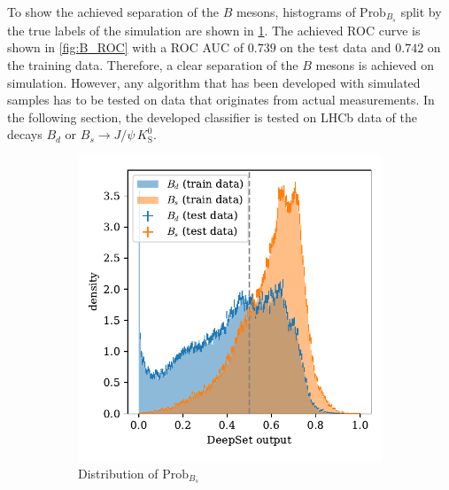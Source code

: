 To show the achieved separation of the $B$ mesons, histograms of $\text{Prob}_{B_s}$ split by the true labels of the simulation are shown in \cref{fig:B_output}.
The achieved ROC curve is shown in \cref{fig:B_ROC} with a ROC AUC of $0.739$ on the test data and $0.742$ on the training data.
Therefore, a clear separation of the $B$ mesons is achieved on simulation.
However, any algorithm that has been developed with simulated samples has to be tested on data that originates from actual measurements. 
In the following section, the developed classifier is tested on LHCb data of the decays $B_d \text{ or } B_s \rightarrow J/\psi \, K^0_\text{S}$.

\begin{figure}
    \centering
    \begin{subfigure}{0.5\textwidth}
        \centering
        \includegraphics[width=\textwidth]{images/B_output.pdf}
        \caption{Distribution of $\text{Prob}_{B_s}$}
        \label{fig:B_output}
    \end{subfigure}%
    \begin{subfigure}{0.5\textwidth}
        \centering

\end{subfigure}
\end{figure}
